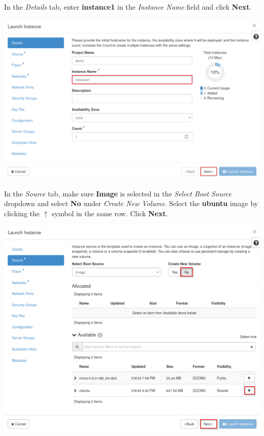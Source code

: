 \documentclass[letterpaper, 12pt]{article}
\begin{document}
\begin{enumerate}
    \begin{labstep}
        In the \textit{Details} tab, enter \textbf{instance1} in the \textit{Instance Name} field and click \textbf{Next}.

        \begin{center}
            \includegraphics[width=\linewidth]{images/part1/step5.png}
        \end{center}
    \end{labstep}

    \begin{labstep}
        In the \textit{Source} tab, make sure \textbf{Image} is selected in the \textit{Select Boot Source} dropdown and select \textbf{No} under \textit{Create New Volume}.
        Select the \textbf{ubuntu} image by clicking the $\uparrow$ symbol in the same row.
        Click \textbf{Next}.

        \begin{center}
            \includegraphics[width=\linewidth]{images/part1/step6.png}
        \end{center}
    \end{labstep}


\end{enumerate}
\end{document}
